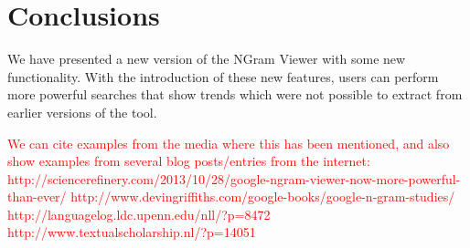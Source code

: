 \documentclass[11pt]{article}
\begin{document}
\section{Conclusions}
We have presented a new version of the NGram Viewer with some new functionality. With the introduction of these new features, users can perform more powerful searches that show trends which were not possible to extract from earlier versions of the tool. 

\textcolor{red}{We can cite examples from the media where this has been mentioned, and also show examples from several blog posts/entries from the internet:
http://sciencerefinery.com/2013/10/28/google-ngram-viewer-now-more-powerful-than-ever/
http://www.devingriffiths.com/google-books/google-n-gram-studies/
http://languagelog.ldc.upenn.edu/nll/?p=8472
http://www.textualscholarship.nl/?p=14051}





\end{document}
